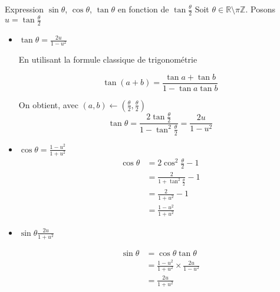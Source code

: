 \documentclass{article}
\renewenvironment{question_kholle}[2][ ]
{
	\subsection{\texorpdfstring{#2}{}}
	\notblank{#1}
	{
		\noindent #1
		\bigbreak
	}
	{}
	\begin{proof}
}
{
	\end{proof}
}
\begin{document}
\begin{question_kholle}{Expression $\sin \theta$, $\cos \theta$, $\tan \theta$ en fonction de $\tan \frac \theta 2$}
    Soit $\theta \in \mathbb{R} \setminus \pi \mathbb{Z}$.
    Posons $u = \tan \frac{\theta}{2}$
    \begin{itemize}[label=$\lozenge$]
        \item $\tan \theta = \frac{2u}{1-u^{2}}$
        
        En utilisant la formule classique de trigonométrie
        
        $$\tan (a+b) = \frac{\tan a+\tan b}{1-\tan a\tan b}$$
        
        On obtient, avec $(a,b) \leftarrow (\frac{\theta}{2}, \frac{\theta}{2})$
        $$
        \tan \theta = \frac{2 \tan \frac{\theta}{2}}{1-\tan ^{2} \frac{\theta}{2}}=\frac{2u}{1-u^{2}}
        $$
        
        
        \item $\cos \theta = \frac{1-u^{2}}{1+u^{2}}$
        \begin{align*}
            \cos \theta  & = 2\cos ^{2} \frac{\theta}{2} -1 \\
            & = \frac{2}{1+\tan ^{2} \frac{\theta}{2}} - 1 \\
            &= \frac{2}{1+u^{2}}-1 \\
            &= \frac{1-u^{2}}{1+u^{2}}
        \end{align*}
        
        \item $\sin \theta \frac{2u}{1+u^{2}}$
        
        \begin{align*}
            \sin \theta  & = \cos \theta \tan \theta \\
            & = \frac{1-u^{2}}{1+u^{2}} \times \frac{2u}{1-u^{2}} \\
            &= \frac{2u}{1+u^{2}}
        \end{align*}
    \end{itemize}
\end{question_kholle}
\end{document}

